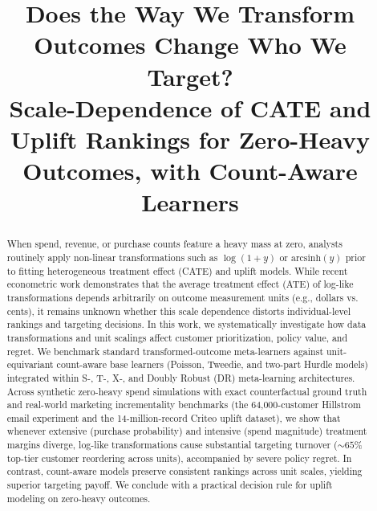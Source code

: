 \documentclass[conference]{IEEEtran}
\begin{document}
\title{Does the Way We Transform Outcomes Change Who We Target?\\
\large Scale-Dependence of CATE and Uplift Rankings for Zero-Heavy Outcomes, with Count-Aware Learners}

\author{
    \and
    \and
    \and
}

\maketitle


\begin{abstract}
When spend, revenue, or purchase counts feature a heavy mass at zero, analysts routinely apply non-linear transformations such as $\log(1+y)$ or $\text{arcsinh}(y)$ prior to fitting heterogeneous treatment effect (CATE) and uplift models. While recent econometric work demonstrates that the average treatment effect (ATE) of log-like transformations depends arbitrarily on outcome measurement units (e.g., dollars vs. cents), it remains unknown whether this scale dependence distorts individual-level rankings and targeting decisions. In this work, we systematically investigate how data transformations and unit scalings affect customer prioritization, policy value, and regret. We benchmark standard transformed-outcome meta-learners against unit-equivariant count-aware base learners (Poisson, Tweedie, and two-part Hurdle models) integrated within S-, T-, X-, and Doubly Robust (DR) meta-learning architectures. Across synthetic zero-heavy spend simulations with exact counterfactual ground truth and real-world marketing incrementality benchmarks (the 64,000-customer Hillstrom email experiment and the 14-million-record Criteo uplift dataset), we show that whenever extensive (purchase probability) and intensive (spend magnitude) treatment margins diverge, log-like transformations cause substantial targeting turnover ($\sim 65\%$ top-tier customer reordering across units), accompanied by severe policy regret. In contrast, count-aware models preserve consistent rankings across unit scales, yielding superior targeting payoff. We conclude with a practical decision rule for uplift modeling on zero-heavy outcomes.
\end{abstract}
\end{document}
